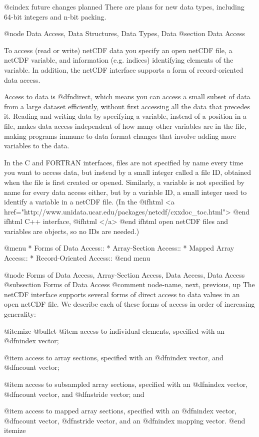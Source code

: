 @cindex future changes planned
There are plans for new data types, including 64-bit integers and n-bit packing.

@node Data Access, Data Structures, Data Types, Data
@section Data Access

To access (read or write) netCDF data you specify an open
netCDF file, a netCDF variable, and information (e.g. indices) identifying
elements of the variable.
In addition, the netCDF interface
supports a form of record-oriented data access.

Access to data is @dfn{direct}, which means you can access a small
subset of data from a large dataset efficiently, without first accessing
all the data that precedes it.
Reading and writing data by specifying a variable,
instead of a position in a file, makes data access independent of
how many other variables are in the file, making programs immune to
data format changes that involve adding more variables to the data.

In the C and FORTRAN interfaces, files are not specified by name every
time you want to access data, but instead by a small integer called a file
ID, obtained when the file is first created or opened.  Similarly, a
variable is not specified by name for every data access either, but by a
variable ID, a small integer used to identify a variable in a netCDF
file.  (In the 
@ifhtml
<a href="http://www.unidata.ucar.edu/packages/netcdf/cxxdoc_toc.html">
@end ifhtml
C++ interface, 
@ifhtml
</a>
@end ifhtml
open netCDF files and variables are
objects, so no IDs are needed.)

@menu
* Forms of Data Access::
* Array-Section Access::
* Mapped Array Access::
* Record-Oriented Access::
@end menu

@node Forms of Data Access, Array-Section Access, Data Access, Data Access
@subsection Forms of Data Access
@comment  node-name,  next,  previous,  up
The netCDF interface supports several forms of direct access to data
values in an open netCDF file.
We describe each of these forms of access in order of increasing
generality:

@itemize @bullet
@item
access to individual elements, specified with an @dfn{index vector};

@item
access to array sections, specified with an @dfn{index vector}, and
@dfn{count vector};

@item
access to subsampled array sections, specified with an @dfn{index vector},
@dfn{count vector}, and @dfn{stride vector}; and

@item
access to mapped array sections, specified with an @dfn{index vector},
@dfn{count vector},
@dfn{stride vector}, and an @dfn{index mapping vector}.
@end itemize


